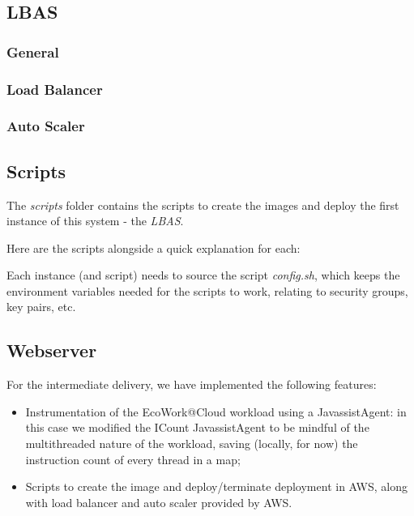 \documentclass{article}
\begin{document}
\subsection{LBAS}

\subsubsection{General}


\subsubsection{Load Balancer}


\subsubsection{Auto Scaler}


\subsection{Scripts}

The \textit{scripts} folder contains the scripts to create the images and deploy
the first instance of this system - the \textit{LBAS}.

Here are the scripts alongside a quick explanation for each:


Each instance (and script) needs to source the script \textit{config.sh}, which
keeps the environment variables needed for the scripts to work, relating to
security groups, key pairs, etc.

\subsection{Webserver}

For the intermediate delivery, we have implemented the following features:
\begin{itemize}
    \item Instrumentation of the EcoWork@Cloud workload using a JavassistAgent:
        in this case we modified the ICount JavassistAgent to be mindful of the
        multithreaded nature of the workload, saving (locally, for now) the
        instruction count of every thread in a map;
    \item Scripts to create the image and deploy/terminate deployment in AWS,
        along with load balancer and auto scaler provided by AWS.
\end{itemize}
\end{document}
